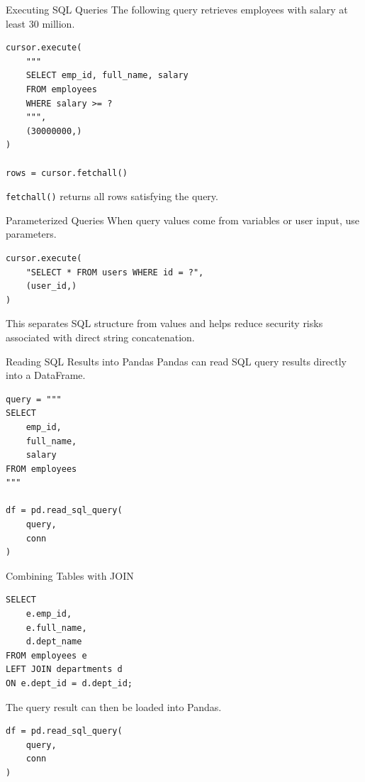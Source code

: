 \documentclass[aspectratio=169,11pt]{beamer}
\newcommand{\code}[1]{\texttt{#1}}
\begin{document}
\begin{frame}[fragile]{Executing SQL Queries}
The following query retrieves employees with salary at least 30 million.

\begin{lstlisting}[style=pythonstyle]
cursor.execute(
    """
    SELECT emp_id, full_name, salary
    FROM employees
    WHERE salary >= ?
    """,
    (30000000,)
)

rows = cursor.fetchall()
\end{lstlisting}

\code{fetchall()} returns all rows satisfying the query.
\end{frame}

\begin{frame}[fragile]{Parameterized Queries}
When query values come from variables or user input, use parameters.

\begin{lstlisting}[style=pythonstyle]
cursor.execute(
    "SELECT * FROM users WHERE id = ?",
    (user_id,)
)
\end{lstlisting}

This separates SQL structure from values and helps reduce security risks associated with direct string concatenation.
\end{frame}

\begin{frame}[fragile]{Reading SQL Results into Pandas}
Pandas can read SQL query results directly into a DataFrame.

\begin{lstlisting}[style=pythonstyle]
query = """
SELECT
    emp_id,
    full_name,
    salary
FROM employees
"""

df = pd.read_sql_query(
    query,
    conn
)
\end{lstlisting}
\end{frame}

\begin{frame}[fragile]{Combining Tables with JOIN}
\begin{lstlisting}[style=textstyle]
SELECT
    e.emp_id,
    e.full_name,
    d.dept_name
FROM employees e
LEFT JOIN departments d
ON e.dept_id = d.dept_id;
\end{lstlisting}

The query result can then be loaded into Pandas.
\begin{lstlisting}[style=pythonstyle]
df = pd.read_sql_query(
    query,
    conn
)
\end{lstlisting}
\end{frame}
\end{document}
